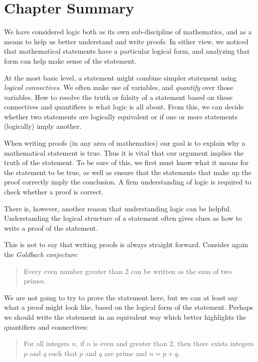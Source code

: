 \documentclass[12pt]{article}
\begin{document}
\section{Chapter Summary}

We have considered logic both as its own sub-discipline of mathematics, and as a means to help us better understand and write proofs.  In either view, we noticed that mathematical statements have a particular logical form, and analyzing that form can help make sense of the statement.  

At the most basic level, a statement might combine simpler statement using \emph{logical connectives}.  We often make use of variables, and \emph{quantify} over those variables.  How to resolve the truth or falsity of a statement based on these connectives and quantifiers is what logic is all about.  From this, we can decide whether two statements are logically equivalent or if one or more statements (logically) imply another.

When writing proofs (in any area of mathematics) our goal is to explain why a mathematical statement is true.  Thus it is vital that our argument implies the truth of the statement.  To be sure of this, we first must know what it means for the statement to be true, as well as ensure that the statements that make up the proof correctly imply the conclusion.  A firm understanding of logic is required to check whether a proof is correct.  

There is, however, another reason that understanding logic can be helpful.  Understanding the logical structure of a statement often gives clues as how to write a proof of the statement.  

This is not to say that writing proofs is always straight forward.  Consider again the \emph{Goldbach conjecture}:

\begin{quote}
Every even number greater than 2 can be written as the sum of two primes.
\end{quote}

We are not going to try to prove the statement here, but we can at least say what a proof might look like, based on the logical form of the statement.  Perhaps we should write the statement in an equivalent way which better highlights the quantifiers and connectives:

\begin{quote}
For all integers $n$, if $n$ is even and greater than 2, then there exists integers $p$ and $q$ such that $p$ and $q$ are prime and $n = p+q$.
\end{quote}
\end{document}
